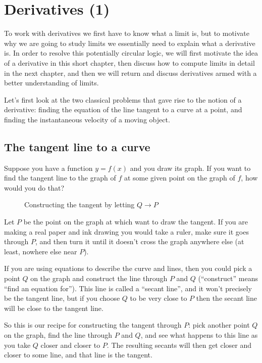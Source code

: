 \chapter{Derivatives (1)}
\label{ch:derivs1}
To work with derivatives we first have to know what a limit is, but to motivate
why we are going to study limits we essentially need to explain what a
derivative is.  In order to resolve this potentially circular logic, we will
first motivate the idea of a derivative in this short chapter, then discuss how
to compute limits in detail in the next chapter, and then we will return and
discuss derivatives armed with a better understanding of limits.




Let's first look at the two classical problems that gave rise to the notion of a
derivative: finding the equation of the line tangent to a curve at a point, and
finding the instantaneous velocity of a moving object.

\section{The tangent line to a curve} 
\label{sec:tangent} Suppose you have a function $y=f(x)$ and you draw its graph.
If you want to find the tangent line to the graph of $f$ at some given point on the
graph of $f$, how would you do that?
\begin{figure}[h]\centering
  
  \caption{Constructing the tangent by letting $Q\to P$}
  \label{fig:constructTheTangent}
\end{figure}

Let $P$ be the point on the graph at which want to draw the tangent.  If you are
making a real paper and ink drawing you would take a ruler, make sure it goes
through $P$, and then turn it until it doesn't cross the graph anywhere else (at
least, nowhere else near $P$).

If you are using equations to describe the curve and lines, then you
could pick a point $Q$ on the graph and construct the line through $P$
and $Q$ (``construct'' means ``find an equation for'').  This line is
called a ``secant line'', and it won't precisely be the tangent line, but if you
choose $Q$ to be very close to $P$ then the secant line will be close to the
tangent line.

So this is our recipe for constructing the tangent through $P$: pick another
point $Q$ on the graph, find the line through $P$ and $Q$, and see what happens
to this line as you take $Q$ closer and closer to $P$.  The resulting secants
will then get closer and closer to some line, and that line is the tangent.

